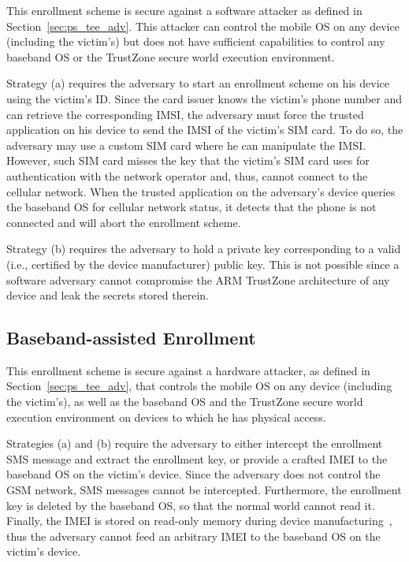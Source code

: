 This enrollment scheme is secure against a software attacker as defined in
Section~\ref{sec:ps_tee_adv}.  This attacker can control the mobile OS on any device
(including the victim's) but does not have sufficient capabilities to control
any baseband OS or the TrustZone secure world execution environment.

Strategy (a) requires the adversary to start an enrollment scheme on his device
using the victim's ID.  Since the card issuer knows the victim's phone number
and can retrieve the corresponding IMSI, the adversary must force the trusted
application on his device to send the IMSI of the victim's SIM card.  To do so,
the adversary may use a custom SIM card where he can manipulate the IMSI.
However, such SIM card misses the key that the victim's SIM card uses for
authentication with the network operator and, thus, cannot connect to the
cellular network.  When the trusted application on the adversary's device
queries the baseband OS for cellular network status, it detects that the phone
is not connected and will abort the enrollment scheme.

Strategy (b) requires the adversary to hold a private key corresponding to a
valid (i.e., certified by the device manufacturer) public key. This is not
possible since a software adversary cannot compromise the ARM TrustZone
architecture of any device and leak the secrets stored therein.

\subsection{Baseband-assisted Enrollment}

This enrollment scheme is secure against a hardware attacker, as defined in
Section~\ref{sec:ps_tee_adv}, that controls the mobile OS on any device (including the
victim's), as well as the baseband OS and the TrustZone secure world execution
environment on devices to which he has physical access.

Strategies (a) and (b) require the adversary to either intercept the enrollment
SMS message and extract the enrollment key, or provide a crafted IMEI to the
baseband OS on the victim's device.  Since the adversary does not control the
GSM network, SMS messages cannot be intercepted.  Furthermore, the enrollment
key is deleted by the baseband OS, so that the normal world cannot read it.
Finally, the IMEI is stored on read-only memory during device
manufacturing~\cite{kostiainen2011codaspy}, thus the adversary cannot feed an
arbitrary IMEI to the baseband OS on the victim's device.

